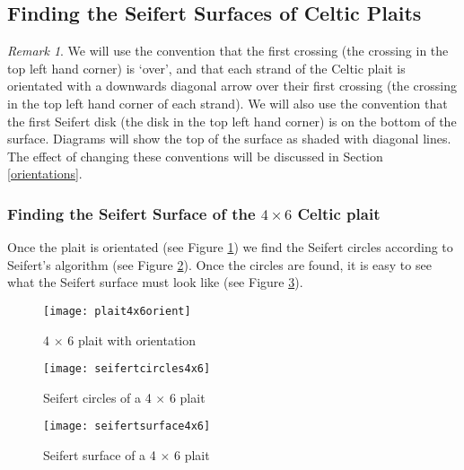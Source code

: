 \documentclass[10pt,a4paper]{report}
\theoremstyle{definition}
\theoremstyle{remark}
\newtheorem*{remark}{Remark}
\theoremstyle{example}
\begin{document}
\subsection{Finding the Seifert Surfaces of Celtic Plaits}

\begin{remark}
We will use the convention that the first crossing (the crossing in the top left hand corner) is `over', 
and that each strand of the Celtic plait is orientated with a downwards diagonal arrow over their first crossing (the crossing in the top left hand corner of each strand). We will also use the convention that the first Seifert disk (the disk in the top left hand corner) is on the bottom of the surface. Diagrams will show the top of the surface as shaded with diagonal lines. The effect of changing these conventions will be discussed in Section \ref{orientations}.
\end{remark}

\subsubsection{Finding the Seifert Surface of the $4 \times 6$ Celtic plait}

 Once the plait is orientated (see Figure \ref{plait4x6orient}) we find the Seifert circles according to Seifert's algorithm (see Figure \ref{seifertcircles4x6}). Once the circles are found, it is easy to see what the Seifert surface must look like (see Figure \ref{seifertsurface4x6}).

\begin{figure}[H]
\centering
\graphicspath{{/Users/Imogen/Desktop/seifertimages/lapath/}}
\texttt{[image: plait4x6orient]}
\caption{4 $\times$ 6 plait with orientation}
\label{plait4x6orient}
\end{figure}

\begin{figure}[H]
\centering
\graphicspath{{/Users/Imogen/Desktop/seifertimages/lapath/}}
\texttt{[image: seifertcircles4x6]}
\caption{Seifert circles of a 4 $\times$ 6 plait}
\label{seifertcircles4x6}
\end{figure}

\begin{figure}[H]
\centering
\graphicspath{{/Users/Imogen/Desktop/seifertimages/lapath/}}
\texttt{[image: seifertsurface4x6]}
\caption{Seifert surface of a 4 $\times$ 6 plait}
\label{seifertsurface4x6}
\end{figure}
\end{document}

